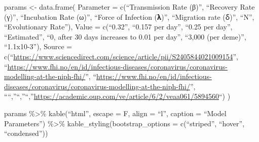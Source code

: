 \documentclass[
  11pt,
]{article}
\begin{document}
params \textless- data.frame( Parameter = c(``Transmission Rate (β)'',
``Recovery Rate (γ)'', ``Incubation Rate (ω)'', ``Force of Infection
(𝛌)'', ``Migration rate (ẟ)'', ``N'', ``Evolutionary Rate''), Value =
c(``0.32'', ``0.157 per day'', ``0.25 per day'', ``Estimated'', ``0,
after 30 days increases to 0.01 per day'', ``3,000 (per deme)'',
``1.1x10-3''), Source =
c(``\url{https://www.sciencedirect.com/science/article/pii/S2405844021009154}'',
``\url{https://www.fhi.no/en/id/infectious-diseases/coronavirus/coronavirus-modelling-at-the-niph-fhi/}'',
``\url{https://www.fhi.no/en/id/infectious-diseases/coronavirus/coronavirus-modelling-at-the-niph-fhi/}'',
````,''``,''``,''\url{https://academic.oup.com/ve/article/6/2/veaa061/5894560}``)
)

params \%\textgreater\% kable(``html'', escape = F, align = ``l'',
caption = ``Model Parameters'') \%\textgreater\%
kable\_styling(bootstrap\_options = c(``striped'', ``hover'',
``condensed''))
\end{document}
